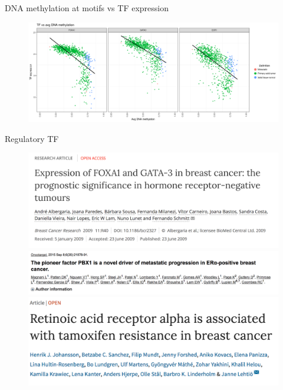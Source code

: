 \documentclass[slidestop,compress,11pt,xcolor=dvipsnames]{beamer}
\begin{document}
\begin{frame}{DNA methylation at motifs vs TF expression}
 \begin{figure}
  \centering
  \includegraphics[width=1.0\linewidth]{ELMER/BRCA_TF_scatter.png}
 \end{figure}
\end{frame}


\begin{frame}{Regulatory TF}
 \vspace*{-0.3cm}
 \begin{figure}
  \centering
  \includegraphics[width=0.8\linewidth]{ELMER/paper4.png}\\
  \includegraphics[width=0.8\linewidth]{ELMER/paper1.png}\\
  \includegraphics[width=0.8\linewidth]{ELMER/paper2.png}
 \end{figure}
\end{frame}
\end{document}

